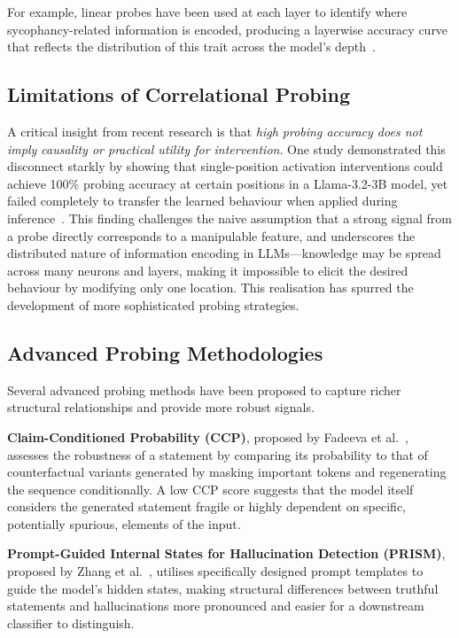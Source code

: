 For example, linear probes have been used at each layer to identify where sycophancy-related
information is encoded, producing a layerwise accuracy curve that reflects the distribution of
this trait across the model's depth~\cite{SLiM}.


\subsection{Limitations of Correlational Probing}

A critical insight from recent research is that \textit{high probing accuracy does not imply
causality or practical utility for intervention}. One study demonstrated this disconnect starkly
by showing that single-position activation interventions could achieve 100\% probing accuracy at
certain positions in a Llama-3.2-3B model, yet failed completely to transfer the learned
behaviour when applied during inference~\cite{SinglePositionFails}. This finding challenges the
naive assumption that a strong signal from a probe directly corresponds to a manipulable feature,
and underscores the distributed nature of information encoding in LLMs—knowledge may be spread
across many neurons and layers, making it impossible to elicit the desired behaviour by modifying
only one location. This realisation has spurred the development of more sophisticated probing
strategies.


\subsection{Advanced Probing Methodologies}

Several advanced probing methods have been proposed to capture richer structural relationships and
provide more robust signals.

\textbf{Claim-Conditioned Probability (CCP)}, proposed by Fadeeva et al.~\cite{CCP}, assesses
the robustness of a statement by comparing its probability to that of counterfactual variants
generated by masking important tokens and regenerating the sequence conditionally. A low CCP score
suggests that the model itself considers the generated statement fragile or highly dependent on
specific, potentially spurious, elements of the input.

\textbf{Prompt-Guided Internal States for Hallucination Detection (PRISM)}, proposed by Zhang et
al.~\cite{PRISM}, utilises specifically designed prompt templates to guide the model's hidden
states, making structural differences between truthful statements and hallucinations more
pronounced and easier for a downstream classifier to distinguish.

